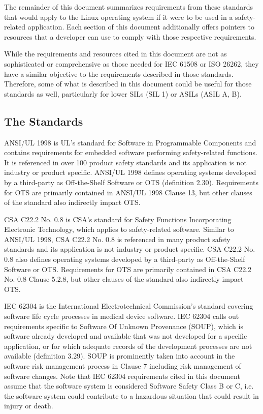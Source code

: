 \documentclass[12pt]{../Common_files/ElisaPaper}
\begin{document}
\bigbreak
The remainder of this document summarizes requirements from these standards that would apply to the Linux operating system if it were to be used in a safety-related application.  Each section of this document additionally offers pointers to resources that a developer can use to comply with those respective requirements. 

\bigbreak
While the requirements and resources cited in this document are not as sophisticated or comprehensive as those needed for IEC 61508 or ISO 26262, they have a similar objective to the requirements described in those standards.  Therefore, some of what is described in this document could be useful for those standards as well, particularly for lower SILs (SIL 1) or ASILs (ASIL A, B).

\subsection{The Standards}
ANSI/UL 1998 \cite{UL1998} is UL's standard for Software in Programmable Components and contains requirements for embedded software performing safety-related functions.  It is referenced in over 100 product safety standards and its application is not industry or product specific.  ANSI/UL 1998 defines operating systems developed by a third-party as Off-the-Shelf Software or OTS (definition 2.30).  Requirements for OTS are primarily contained in ANSI/UL 1998 Clause 13, but other clauses of the standard also indirectly impact OTS.

\bigbreak
CSA C22.2 No. 0.8 \cite{CSA0.8} is CSA's standard for Safety Functions Incorporating Electronic Technology, which applies to safety-related software.  Similar to ANSI/UL 1998, CSA C22.2 No. 0.8 is referenced in many product safety standards and its application is not industry or product specific.  CSA C22.2 No. 0.8 also defines operating systems developed by a third-party as Off-the-Shelf Software or OTS.  Requirements for OTS are primarily contained in CSA C22.2 No. 0.8 Clause 5.2.8, but other clauses of the standard also indirectly impact OTS.

\bigbreak
IEC 62304 \cite{IEC62304} is the International Electrotechnical Commission's standard covering software life cycle processes in medical device software.  IEC 62304 calls out requirements specific to Software Of Unknown Provenance (SOUP), which is software already developed and available that was not developed for a specific application, or for which adequate records of the development processes are not available (definition 3.29).  SOUP is prominently taken into account in the software risk management process in Clause 7 including risk management of software changes.  Note that IEC 62304 requirements cited in this document assume that the software system is considered Software Safety Class B or C, i.e. the software system could contribute to a hazardous situation that could result in injury or death.
\end{document}
